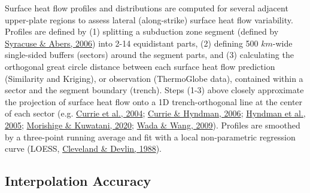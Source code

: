 Surface heat flow profiles and distributions are computed for several adjacent upper-plate regions to assess lateral (along-strike) surface heat flow variability. Profiles are defined by (1) splitting a subduction zone segment (defined by \protect\hyperlink{ref-syracuse2006}{Syracuse \& Abers, 2006}) into 2-14 equidistant parts, (2) defining 500 \(km\)-wide single-sided buffers (sectors) around the segment parts, and (3) calculating the orthogonal great circle distance between each surface heat flow prediction (Similarity and Kriging), or observation (ThermoGlobe data), contained within a sector and the segment boundary (trench). Steps (1-3) above closely approximate the projection of surface heat flow onto a 1D trench-orthogonal line at the center of each sector (e.g. \protect\hyperlink{ref-currie2004}{Currie et al., 2004}; \protect\hyperlink{ref-currie2006}{Currie \& Hyndman, 2006}; \protect\hyperlink{ref-hyndman2005}{Hyndman et al., 2005}; \protect\hyperlink{ref-morishige2020}{Morishige \& Kuwatani, 2020}; \protect\hyperlink{ref-wada2009}{Wada \& Wang, 2009}). Profiles are smoothed by a three-point running average and fit with a local non-parametric regression curve (LOESS, \protect\hyperlink{ref-cleveland1988}{Cleveland \& Devlin, 1988}).

\hypertarget{interpolation-accuracy}{%
\subsection{Interpolation Accuracy}\label{interpolation-accuracy}}

